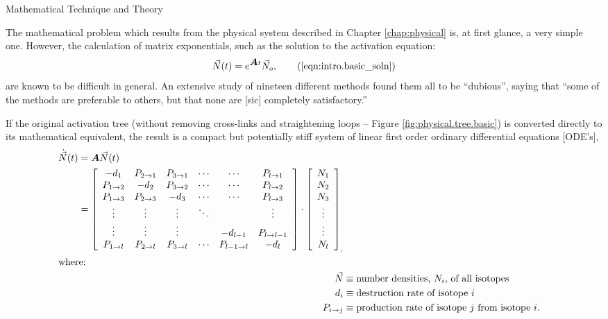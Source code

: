 \begin{chapter}{Mathematical Technique and Theory}

The mathematical problem which results from the physical system
described in Chapter \ref{chap:physical} is, at first glance, a very
simple one.  However, the calculation of matrix exponentials, such as
the solution to the activation equation:
\begin{equation}
  \vec{N}(t) = e^{\mat{A} t} \vec{N}_o,\tag{\ref{eqn:intro.basic_soln}}
\end{equation}
are known to be difficult in
general.  An extensive study of nineteen different methods found them
all to be ``dubious'', saying that ``some of the methods are
preferable to others, but that none are [sic] completely
satisfactory.''\cite{DUBIOUS}

If the original activation tree (without removing cross-links and
straightening loops -- Figure \ref{fig:physical.tree.basic}) is
converted directly to its mathematical equivalent, the result is a
compact but potentially stiff system of linear first order ordinary
differential equations [ODE's],
\begin{align}
  \begin{split}
    \dot{\vec{N}}(t) &= \mbox{\boldmath $A$}\vec{N}(t)\\
    &= \left [
      \begin{array}{cccccc}
        -d_1 & P_{2\rightarrow 1} & P_{3\rightarrow 1} & \cdots & \cdots & P_{l\rightarrow 1}\\
        P_{1\rightarrow 2} & -d_2 & P_{3\rightarrow 2} & \cdots & \cdots & P_{l\rightarrow 2}\\
        P_{1\rightarrow 3} & P_{2\rightarrow 3} & -d_3 & \cdots & \cdots & P_{l\rightarrow 3}\\
        \vdots & \vdots & \vdots & \ddots &  & \vdots\\
        \vdots & \vdots & \vdots & & -d_{l-1} & P_{l\rightarrow l-1}\\
        P_{1\rightarrow l} & P_{2\rightarrow l} & P_{3\rightarrow l} & \cdots & P_{l-1\rightarrow l} & -d_l
      \end{array} \right ] \cdot \left [
      \begin{array}{c}
        N_1 \\ N_2 \\ N_3 \\ \vdots \\ \vdots \\ N_l
      \end{array} \right ]_,
  \end{split}\label{eq:math.intro.explicit}\\
  \intertext{where:}
  \vec{N} &\equiv \text{number densities, $N_i$, of all isotopes}\notag \\
  d_i &\equiv \text{destruction rate of isotope $i$}\notag \\
  P_{i\rightarrow j} &\equiv \text{production rate of isotope $j$ from isotope $i$.}\notag
\end{align}


\end{chapter}
